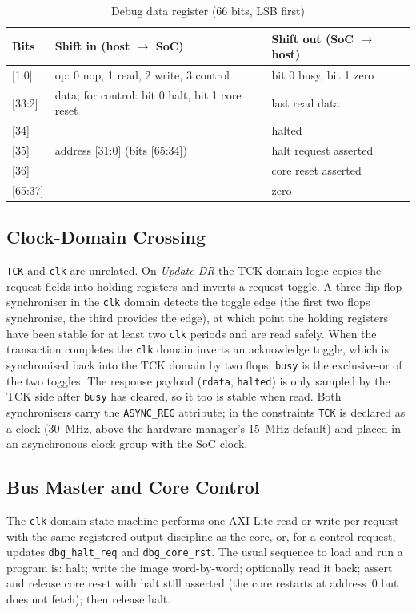 \documentclass[journal,10pt]{IEEEtran}
\newcommand{\reg}[1]{\texttt{#1}}
\begin{document}
\begin{table}[t]
\caption{Debug data register (66 bits, LSB first)}
\label{tab:dr}
\centering
\footnotesize
\begin{tabular}{@{}lp{3.4cm}p{2.7cm}@{}}
\toprule
Bits & Shift in (host $\rightarrow$ SoC) & Shift out (SoC $\rightarrow$ host) \\
\midrule
{[1:0]}   & op: 0 nop, 1 read, 2 write, 3 control & bit 0 busy, bit 1 zero \\
{[33:2]} & data; for control: bit 0 halt, bit 1 core reset & last read data \\
{[34]}  & \multirow{3}{3.3cm}{address [31:0] (bits [65:34])} & halted \\
{[35]}  &  & halt request asserted \\
{[36]}  &  & core reset asserted \\
{[65:37]} & & zero \\
\bottomrule
\end{tabular}
\end{table}

\subsection{Clock-Domain Crossing}
\reg{TCK} and \reg{clk} are unrelated. On \emph{Update-DR} the TCK-domain
logic copies the request fields into holding registers and inverts a
request toggle. A three-flip-flop synchroniser in the \reg{clk} domain
detects the toggle edge (the first two flops synchronise, the third
provides the edge), at which point the holding registers have been stable
for at least two \reg{clk} periods and are read safely. When the transaction
completes the \reg{clk} domain inverts an acknowledge toggle, which is
synchronised back into the TCK domain by two flops; \reg{busy} is the
exclusive-or of the two toggles. The response payload (\reg{rdata},
\reg{halted}) is only sampled by the TCK side after \reg{busy} has cleared,
so it too is stable when read. Both synchronisers carry the \reg{ASYNC\_REG}
attribute; in the constraints \reg{TCK} is declared as a clock (30~MHz,
above the hardware manager's 15~MHz default) and placed in an asynchronous
clock group with the SoC clock.

\subsection{Bus Master and Core Control}
The \reg{clk}-domain state machine performs one AXI-Lite read or write per
request with the same registered-output discipline as the core, or, for a
control request, updates \reg{dbg\_halt\_req} and \reg{dbg\_core\_rst}. The
usual sequence to load and run a program is: halt; write the image
word-by-word; optionally read it back; assert and release core reset with
halt still asserted (the core restarts at address~0 but does not fetch); then
release halt.
\end{document}
